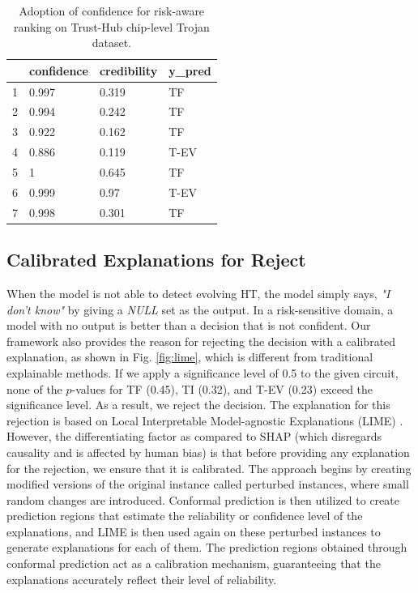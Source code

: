 \begin{table}[t]
\centering
\caption{Adoption of confidence for risk-aware ranking on Trust-Hub chip-level Trojan dataset.}
\begin{tabular}{llll}
\hline
  & \textbf{confidence} & \textbf{credibility} & \textbf{y\_pred} \\ \hline
1 & 0.997               & 0.319                & TF               \\ \hline
2 & 0.994               & 0.242                & TF               \\ \hline
3 & 0.922               & 0.162                & TF               \\ \hline
4 & 0.886               & 0.119                & T-EV             \\ \hline
5 & 1                   & 0.645                & TF               \\ \hline
6 & 0.999               & 0.97                 & T-EV             \\ \hline
7 & 0.998               & 0.301                & TF               \\ \hline
\end{tabular}
\label{tab:confcred}
\end{table}



\subsection*{Calibrated Explanations for Reject}
\label{Sec:explain}
When the model is not able to detect evolving HT, the model simply says, \textit{"I don't know"} by giving a \textit{NULL} set as the output. In a risk-sensitive domain, a model with no output is better than a decision that is not confident. Our framework also provides the reason for rejecting the decision with a calibrated explanation, as shown in Fig. \ref{fig:lime}, which is different from traditional explainable methods. If we apply a significance level of 0.5 to the given circuit, none of the $p$-values for TF (0.45), TI (0.32), and T-EV (0.23) exceed the significance level. As a result, we reject the decision. The explanation for this rejection is based on Local Interpretable Model-agnostic Explanations (LIME) \cite{dieber2020model}. However, the differentiating factor as compared to SHAP (which disregards causality and is affected by human bias) is that before providing any explanation for the rejection, we ensure that it is calibrated. The approach begins by creating modified versions of the original instance called perturbed instances, where small random changes are introduced. Conformal prediction is then utilized to create prediction regions that estimate the reliability or confidence level of the explanations, and LIME is then used again on these perturbed instances to generate explanations for each of them. The prediction regions obtained through conformal prediction act as a calibration mechanism, guaranteeing that the explanations accurately reflect their level of reliability. 

\endgroup